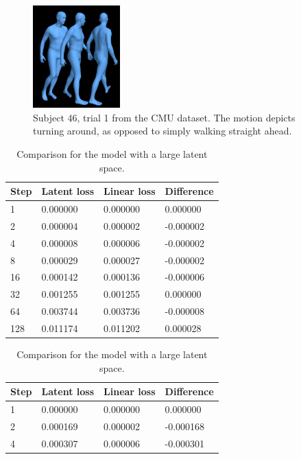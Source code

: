 \begin{figure}[h]
\centering
\includegraphics[width=0.3\textwidth]{img/46_01_turning}
\caption{Subject 46, trial 1 from the CMU dataset. The motion depicts turning around, as opposed to simply walking straight ahead.}
\label{fig:test-turning}
\end{figure}

\begin{table}[h]
    \begin{subtable}[h]{0.45\textwidth}
        \centering
        \begin{tabular}{@{}llll@{}}
        \toprule
        Step & Latent loss & Linear loss & Difference \\ \midrule
1 & 0.000000 & 0.000000 & 0.000000 \\
2 & 0.000004 & 0.000002 & -0.000002 \\
4 & 0.000008 & 0.000006 & -0.000002 \\
8 & 0.000029 & 0.000027 & -0.000002 \\
16 & 0.000142 & 0.000136 & -0.000006 \\
32 & 0.001255 & 0.001255 & 0.000000 \\
64 & 0.003744 & 0.003736 & -0.000008 \\
128 & 0.011174 & 0.011202 & 0.000028 \\ \bottomrule
        \end{tabular}
        \caption{Comparison for the model with a large latent space.}
        \label{tab:ae-eval-large}
    \end{subtable}
    \hfill
    \begin{subtable}[h]{0.45\textwidth}
        \centering
        \begin{tabular}{@{}llll@{}}
        \toprule
        Step & Latent loss & Linear loss & Difference \\ \midrule
1 & 0.000000 & 0.000000 & 0.000000 \\
2 & 0.000169 & 0.000002 & -0.000168 \\
4 & 0.000307 & 0.000006 & -0.000301 \\

\end{tabular}
\end{subtable}
\end{table}
